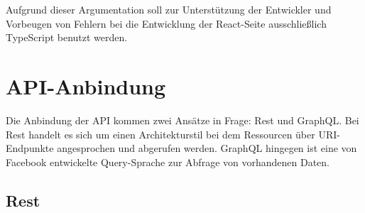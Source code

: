 Aufgrund dieser Argumentation soll zur Unterstützung der Entwickler und Vorbeugen von Fehlern bei die Entwicklung der React-Seite ausschließlich TypeScript benutzt werden. 

\section{API-Anbindung}
Die Anbindung der API kommen zwei Ansätze in Frage: Rest und GraphQL. Bei Rest handelt es sich um einen Architekturstil bei dem Ressourcen über URI-Endpunkte angesprochen und abgerufen werden. GraphQL hingegen ist eine von Facebook entwickelte Query-Sprache zur Abfrage von vorhandenen Daten.

\subsection{Rest}


